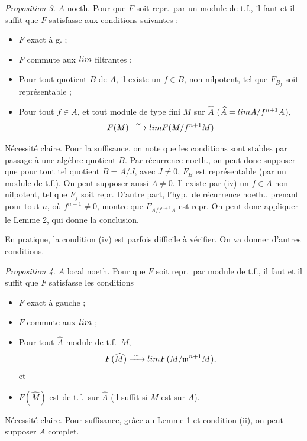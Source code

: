 \documentclass[11pt,a4paper]{article}
\begin{document}
\emph{Proposition 3.} $A$ noeth. Pour que $F$ soit repr.\ par un module de
t.f., il faut et il suffit que $F$ satisfasse aux conditions suivantes :
\begin{itemize}
  \item[(i)] $F$ exact à g. ;
  \item[(ii)] $F$ commute aux $\varinjlim$  filtrantes ;
  \item[(iv)] Pour tout quotient $B$ de $A$,  il
    existe un $f \in B$, non nilpotent, tel que $F_{B_f}$ soit représentable ;
  \item[(iii)] Pour tout $f \in A$, et tout module de type fini $M$ sur
    $\widehat{A}$ ($\widehat{A} = \varprojlim A/f^{n+1}A$),
    \[
      F(M) \xrightarrow{\ \sim\ } \varprojlim F(M/f^{n+1}M)
    \]
\end{itemize}

Nécessité claire. Pour la suffisance, on note que les conditions sont stables
par passage à une algèbre quotient $B$. Par récurrence noeth., on peut donc
supposer que pour tout tel quotient $B = A/J$, avec $J \neq 0$, $F_B$ est
représentable (par un module de t.f.). On peut supposer aussi $A \neq 0$. Il
existe par (iv) un $f \in A$ non nilpotent, tel que $F_f$ soit repr. D'autre
part, l'hyp.\ de récurrence noeth., prenant pour tout $n$, où
$f^{n+1} \neq 0$, montre que $F_{A/f^{n+1}A}$ est repr. On peut donc appliquer
le Lemme 2, qui donne la conclusion.

En pratique, la condition (iv) est parfois difficile à vérifier. On va donner
d'autres conditions.

\emph{Proposition 4.} $A$ local noeth. Pour que $F$ soit repr.\ par module de
t.f., il faut et il suffit que $F$ satisfasse les conditions
\begin{itemize}
  \item[(i)] $F$ exact à gauche ;
  \item[(ii)] $F$ commute aux $\varinjlim$ ;
  \item[(iii)] Pour tout $\widehat{A}$-module de t.f.\ $M$,
    \[
      F(\widehat{M}) \xrightarrow{\ \sim\ } \varprojlim F(M/\mathfrak{m}^{n+1}M),
    \]
    et
  \item[(iv)] $F(\widehat{M})$ est de t.f.\ sur $\widehat{A}$ (il suffit
    \ill{} si $M$ est  sur $A$).
\end{itemize}
Nécessité claire. Pour suffisance, grâce au Lemme 1 et condition (ii), on
peut supposer $A$ complet.
\end{document}
